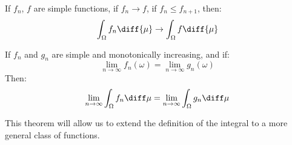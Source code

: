         \begin{theorem}
            If $f_{n}$, $f$ are simple functions, if
            $f_{n}\rightarrow{f}$, if $f_{n}\leq{f}_{n+1}$,
            then:
            \begin{equation}
                \int_{\Omega}f_{n}\diff{\mu}
                \rightarrow\int_{\Omega}f\diff{\mu}
            \end{equation}
        \end{theorem}
        \begin{theorem}
            \label{thm:MEASURE_THEORY_LIM_INT_MONO_SIMPLE_FUNCS}%
            If $f_{n}$ and $g_{n}$ are simple and monotonically increasing,
            and if:
            \begin{equation}
                \underset{n\rightarrow\infty}{\lim}f_{n}(\omega)
                =\underset{n\rightarrow\infty}{\lim}g_{n}(\omega)
            \end{equation}
            Then:
            \begin{equation}
                \underset{n\rightarrow\infty}{\lim}\int_{\Omega}f_{n}\diff\mu
                =\underset{n\rightarrow\infty}{\lim}\int_{\Omega}g_{n}\diff\mu
            \end{equation}
        \end{theorem}
        This theorem will allow us to extend the definition of the integral to
        a more general class of functions.
